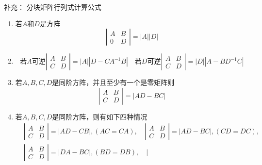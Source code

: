 \documentclass{article}
\numberwithin{equation}{subsection}
\begin{document}
补充：
分块矩阵行列式计算公式
\begin{enumerate}
    \item 若$A$和$D$是方阵
    \begin{equation}
        \left|\begin{array}{ll}
            A & B \\
            0 & D
            \end{array}\right|=|A||D|
    \end{equation}
    \item
    \begin{equation}
        \text{若$A$可逆}\left|\begin{array}{ll}
            A & B \\
            C & D
            \end{array}\right|=|A|\left|D-C A^{-1} B\right|\quad\text{若$D$可逆}\left|\begin{array}{ll}
                A & B \\
                C & D
                \end{array}\right|=|D|\left|A-B D^{-1} C\right|
    \end{equation}
    \item 若$A,B,C,D$是同阶方阵，并且至少有一个是零矩阵则
    \begin{equation}
        \left|\begin{array}{ll}
            A & B \\
            C & D
            \end{array}\right|=|A D-B C|
    \end{equation}
    \item 若$A,B,C,D$是同阶方阵，则有如下四种情况
    \begin{equation}
    \begin{split}
        &\left|\begin{array}{ll}
            A & B \\
            C & D
            \end{array}\right|=|A D-C B|,(AC=CA),\quad\left|\begin{array}{ll}
                A & B \\
                C & D
                \end{array}\right|=|A D-B C|,(CD=DC),\quad \\
        &\left|\begin{array}{ll}
                    A & B \\
                    C & D
                    \end{array}\right|=|D A-B C|,(BD=DB),\quad \left|\begin{array}{ll}

\end{array}
\end{split}
\end{equation}
\end{enumerate}
\end{document}
